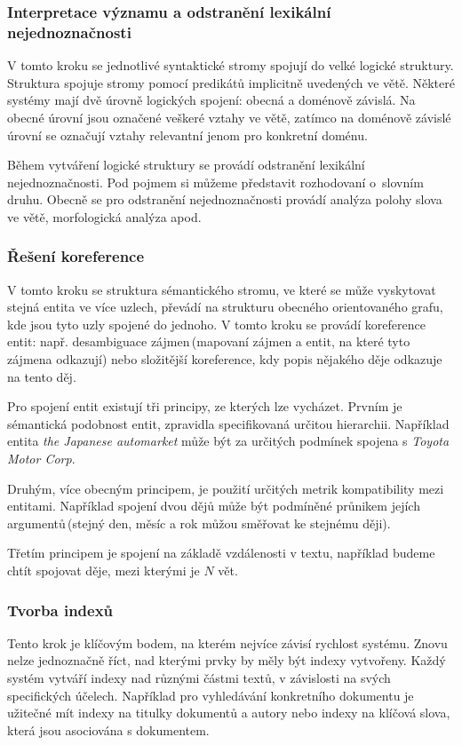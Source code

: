 \subsubsection*{Interpretace významu  a odstranění lexikální nejednoznačnosti}
V tomto kroku se jednotlivé syntaktické stromy spojují do velké logické struktury. Struktura spojuje stromy pomocí predikátů implicitně uvedených ve větě. Některé systémy mají dvě úrovně logických spojení: obecná a doménově závislá. Na obecné úrovní jsou označené veškeré vztahy ve větě, zatímco na doménově závislé úrovní se označují vztahy relevantní jenom pro  konkretní doménu.    

Během vytváření logické struktury se provádí odstranění lexikální nejednoznačnosti. Pod pojmem  si můžeme představit rozhodovaní o~slovním druhu. Obecně se pro odstranění nejednoznačnosti provádí analýza polohy slova ve větě, morfologická analýza apod.  

\subsubsection*{Řešení koreference}
V tomto kroku se struktura sémantického stromu, ve které se může vyskytovat stejná entita ve více uzlech, převádí na strukturu obecného orientovaného grafu, kde jsou tyto uzly  spojené do jednoho.  V tomto kroku se provádí koreference entit: např. desambiguace zájmen\,(mapovaní zájmen a entit, na které tyto zájmena odkazují) nebo složitější koreference, kdy popis nějakého děje odkazuje na tento děj.   

Pro spojení entit existují tři principy, ze kterých lze vycházet. Prvním je sémantická podobnost entit, zpravidla specifikovaná určitou hierarchii. Například entita \emph{the Japanese automarket} může být za určitých podmínek spojena s \emph{Toyota Motor Corp}.

Druhým, více obecným principem, je použití určitých metrik kompatibility mezi entitami. Například spojení dvou dějů může být podmíněné průnikem jejích argumentů\,(stejný den, měsíc a rok můžou směřovat ke stejnému ději). 

Třetím principem je spojení na základě vzdálenosti v textu, například budeme chtít spojovat děje, mezi kterými je $N$ vět. 


\subsubsection*{Tvorba indexů}
Tento krok je klíčovým bodem, na kterém nejvíce závisí rychlost systému. Znovu nelze jednoznačně říct, nad kterými prvky by měly být indexy vytvořeny. Každý systém vytváří indexy nad různými částmi textů, v závislosti na svých specifických účelech. Například pro vyhledávání konkretního dokumentu je užitečné mít indexy na titulky dokumentů a autory nebo indexy na klíčová slova, která jsou asociována s dokumentem.


